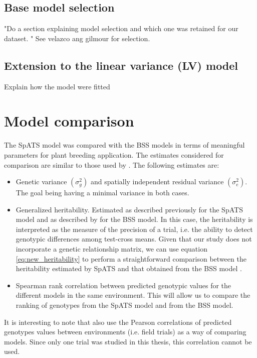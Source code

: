 \subsection{Base model selection}
"Do a section explaining model selection and which one was retained for our dataset. "
See velazco ang gilmour for selection.

\subsection{Extension to the linear variance (LV) model}

\begin{formal}
Explain how the model were fitted
\end{formal}

\section{Model comparison}
The SpATS model was compared with the BSS models in terms of meaningful parameters for plant breeding application. The estimates considered for comparison are similar to those used by \textcite{velazco_modelling_2017}. The following estimates are:
\begin{itemize}
    \item Genetic variance $(\sigma_g^2)$ and spatially independent residual variance $(\sigma_e^2)$. The goal being having a minimal variance in both cases.
    \item Generalized heritability. Estimated as described previously for the SpATS model and as described by \textcite{cullis_design_2006} for the BSS model. In this case, the heritability is interpreted as the measure of the precision of a trial, i.e. the ability to detect genotypic differences among test-cross means. Given that our study does not incorporate a genetic relationship matrix, we can use equation \ref{eq:new_heritability} to perform a straightforward comparison between the heritability estimated by SpATS and that obtained from the BSS model \parencite{velazco_modelling_2017}.
    \item Spearman rank correlation between predicted genotypic values for the different models in the same environment. This will allow us to compare the ranking of genotypes from the SpATS model and from the BSS model.
\end{itemize}
It is interesting to note that \textcite{rodriguez-alvarez_correcting_2018} also use the Pearson correlations of predicted genotypes values between environments (i.e. field trials) as a way of comparing models. Since only one trial was studied in this thesis, this correlation cannot be used.
